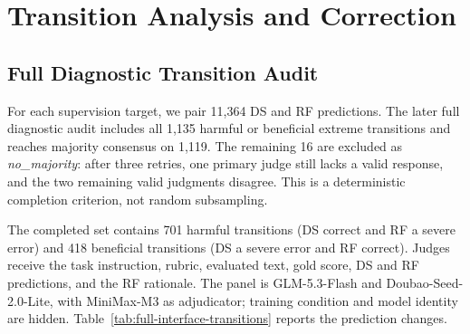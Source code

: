 \clearpage
\begingroup
\raggedbottom
\setlength{\baselineskip}{13pt}

\section{Transition Analysis and Correction}
\label{app:sentence-level-analysis}

\subsection{Full Diagnostic Transition Audit}

For each supervision target, we pair 11,364 DS and RF predictions. The later
full diagnostic audit includes all 1,135 harmful or beneficial extreme
transitions and reaches majority consensus on 1,119. The remaining 16 are
excluded as \textit{no\_majority}: after three retries, one primary judge still
lacks a valid response, and the two remaining valid judgments disagree. This
is a deterministic completion criterion, not random subsampling.

The completed set contains 701 harmful transitions (DS correct and RF a severe
error) and 418 beneficial transitions (DS a severe error and RF correct).
Judges receive the task instruction, rubric, evaluated text, gold score, DS and
RF predictions, and the RF rationale. The panel is GLM-5.3-Flash and
Doubao-Seed-2.0-Lite, with MiniMax-M3 as adjudicator; training condition and
model identity are hidden. Table~\ref{tab:full-interface-transitions} reports
the prediction changes.

